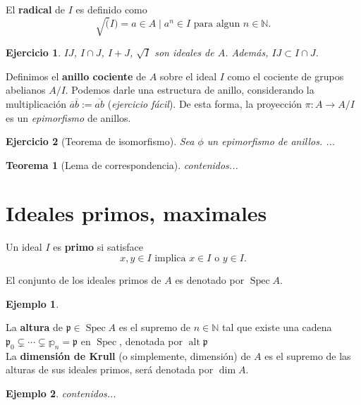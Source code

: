 \documentclass[12pt]{book}
\newtheorem{eje}{Ejemplo}
\newtheorem{teo}{Teorema}
\newtheorem{ex}{Ejercicio}
\begin{document}
El \textbf{radical} de $I$ es definido como $$ \sqrt (I) = {a \in A \; | \; a^n \in I \mbox{ para algun }n\in \mathbb{N} } .$$

\begin{ex}
$IJ$, $I\cap J$, $I+J$, $\sqrt{I}$ son ideales de $A$. Además, $IJ \subset I\cap J$. 
\end{ex} 



Definimos el \textbf{anillo cociente} de $A$ sobre el ideal $I$ como el cociente de grupos abelianos $A/I$. Podemos darle una estructura de anillo, considerando la multiplicación $ \overline{a} \overline{b} := \overline{ab}$ (\textit{ejercicio fácil}). De esta forma, la proyección $\pi:A\rightarrow A/I$ es un \textit{epimorfismo} de anillos.\\

\begin{ex}[Teorema de isomorfismo]
Sea $\phi$ un epimorfismo de anillos. ...
\end{ex}

\begin{teo}[Lema de correspondencia]
	contenidos...
\end{teo}

\section{Ideales primos, maximales}

Un ideal $I$ es \textbf{primo} si satisface $$ x,y \in I \mbox{ implica } x \in I \mbox{ o } y\in I .$$

El conjunto de los ideales primos de $A$ es denotado por $\operatorname{Spec}A$.



\begin{eje}

\end{eje} 
La \textbf{altura} de $\mathfrak{p}\in \operatorname{Spec}A$ es el supremo de $n\in \mathbb{N}$ tal que existe una cadena $ \mathfrak{p}_0 \subsetneq \cdots \subsetneq \mathbb{p}_n = \mathfrak{p}$ en $\operatorname{Spec}$, denotada por $\operatorname{alt} \mathfrak{p}$\\
La \textbf{dimensión de Krull} (o simplemente, dimensión) de $A$ es el supremo de las alturas de sus ideales primos, será denotada por $\dim A$.

\begin{eje}
	contenidos...
\end{eje}
\end{document}
